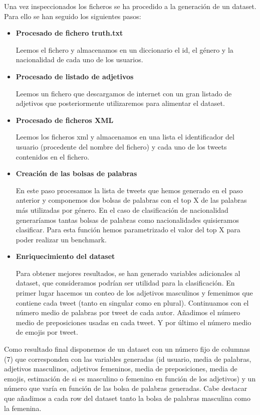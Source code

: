\documentclass[11pt,a4paper]{article}
\begin{document}
Una vez inspeccionados los ficheros se ha procedido a la generación de un dataset. Para ello se han seguido los siguientes pasos:
\begin{itemize}
	\item \textbf{Procesado de fichero truth.txt }
    
    Leemos el fichero y almacenamos en un diccionario el id, el género y la nacionalidad de cada uno de los usuarios.
    \item \textbf{Procesado de listado de adjetivos }
    
    Leemos un fichero que descargamos de internet con un gran listado de adjetivos que posteriormente utilizaremos para alimentar el dataset.
    
    \item \textbf{Procesado de ficheros XML }
    
    Leemos los ficheros xml y almacenamos en una lista el identificador del usuario (procedente del nombre del fichero) y cada uno de los tweets contenidos en el fichero.

\item \textbf{Creación de las bolsas de palabras }

En este paso procesamos la lista de tweets que hemos generado en el paso anterior y componemos dos bolsas de palabras con el top X de las palabras más utilizadas por género. En el caso de clasificación de nacionalidad generaríamos tantas bolsas de palabras como nacionalidades quisieramos clasificar. Para esta función hemos parametrizado el valor del top X para poder realizar un benchmark.

\item \textbf{Enriquecimiento del dataset }

Para obtener mejores resultados, se han generado variables adicionales al dataset, que consideramos podrían ser utilidad para la clasificación. 
En primer lugar hacemos un conteo de los adjetivos masculinos y femenimos que contiene cada tweet (tanto en singular como en plural).
Continuamos con el número medio de palabras por tweet de cada autor.
Añadimos el número medio de preposiciones usadas en cada tweet.
Y por último el número medio de emojis por tweet.

\end{itemize}

Como resultado final disponemos de un dataset con un número fijo de columnas (7) que corresponden con las variables generadas (id usuario, media de palabras, adjetivos masculinos, adjetivos femeninos, media de preposiciones, media de emojis, estimación de si es masculino o femenino en función de los adjetivos) y un número que varía en función de las bolsa de palabras generadas. 
Cabe destacar que añadimos a cada row del dataset tanto la bolsa de palabras masculina como la femenina.
\end{document}
